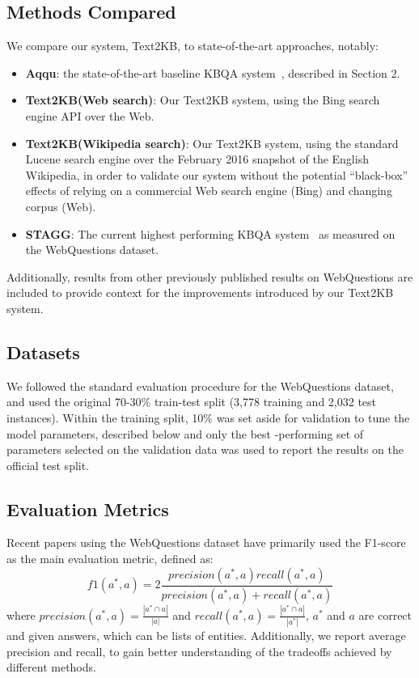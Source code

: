 \subsection{Methods Compared}
\label{sec:eval_methods}

We compare our system, Text2KB, to state-of-the-art approaches, notably:
\begin{itemize}[noitemsep,topsep=0pt]
\item{\textbf{Aqqu}}: the state-of-the-art baseline KBQA system~\cite{ACCU:2015}, described in Section 2.
\item{\textbf{Text2KB(Web search)}}: Our Text2KB system, using the Bing search engine API over the Web. 
\item{\textbf{Text2KB(Wikipedia search)}}: Our Text2KB system, using the standard Lucene search engine over the February 2016 snapshot of the English Wikipedia, in order to validate our system without the potential ``black-box'' effects of relying on a commercial Web search engine (Bing) and changing corpus (Web).
\item{\textbf{STAGG}}: The current highest performing KBQA system~\cite{yih2015semantic} as measured on the WebQuestions dataset.
\end{itemize}
Additionally, results from other previously published results on WebQuestions are included to provide context for the improvements introduced by our Text2KB system.

\subsection{Datasets}
\label{sec:eval_data}
We followed the standard evaluation procedure for the WebQuestions dataset, and used the original 70-30\% train-test split (3,778 training and 2,032 test instances). Within the training split, 10\% was set aside for validation to tune the model parameters, described below and only the best -performing set of parameters selected on the validation data was used to report the results on the official test split.

\subsection{Evaluation Metrics}
\label{sec:metrics}
Recent papers using the WebQuestions dataset have primarily used the F1-score as the main evaluation metric, defined as:
$$f1(a^*, a) = 2\frac{precision(a^*,a) recall(a^*,a)}{precision(a^*,a) + recall(a^*,a)}$$
where $precision(a^*, a)=\frac{|a^* \cap a|}{|a|}$ and $recall(a^*, a) = \frac{|a^* \cap a|}{|a^*|}$, $a^*$ and $a$ are correct and given answers, which can be lists of entities.
Additionally, we report average precision and recall, to gain better understanding of the tradeoffs achieved by different methods.

